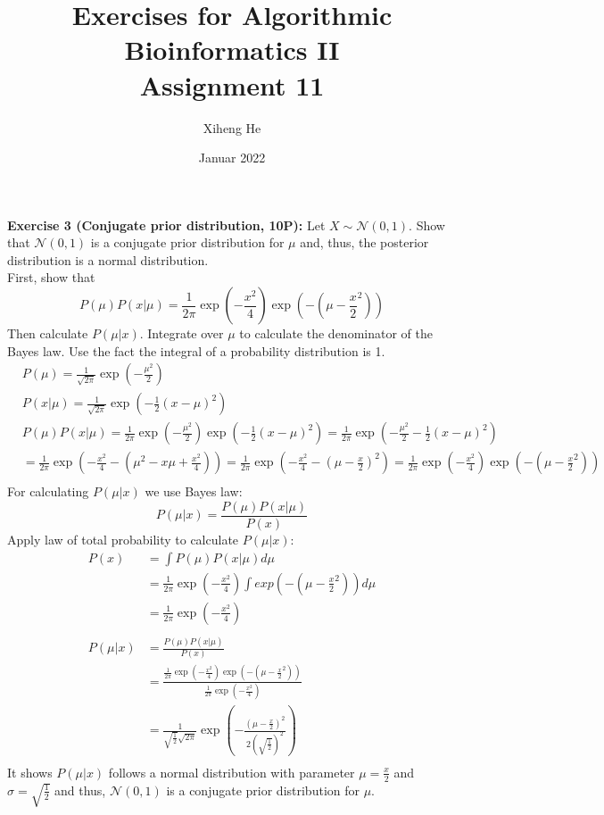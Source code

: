 \documentclass[12pt]{article}
\title{Exercises for Algorithmic Bioinformatics II\\
Assignment 11}
\author{Xiheng He}
\date{Januar 2022}
\begin{document}
{\let\newpage\relax\maketitle}
\begin{flushleft}
\textbf{Exercise 3 (Conjugate prior distribution, 10P):}
\newline
Let $X \sim \mathcal{N}(0,1)$. Show that $\mathcal{N}(0,1)$ is a conjugate prior distribution for $\mu$ and,
thus, the posterior distribution is a normal distribution.
\newline\\
First, show that $$ P(\mu) P(x | \mu) = \frac{1}{2 \pi} \exp(-\frac{x^2}{4}) \exp(-(\mu - \frac{x}{2}^2)) $$
Then calculate $P(\mu | x)$. Integrate over $\mu$ to calculate the denominator of the Bayes law.
Use the fact the integral of a probability distribution is 1.
\newline
\begin{align*}
    &P(\mu) = \frac{1}{\sqrt{2 \pi}} \exp(-\frac{\mu^2}{2}) \\
    &P(x | \mu) = \frac{1}{\sqrt{2 \pi}} \exp(-\frac{1}{2} (x - \mu)^2) \\
    &P(\mu) P(x | \mu) = \frac{1}{2 \pi} \exp(-\frac{\mu^2}{2}) \exp(-\frac{1}{2} (x - \mu)^2)
    = \frac{1}{2 \pi} \exp(-\frac{\mu^2}{2}-\frac{1}{2}(x - \mu)^2) \\
    &= \frac{1}{2 \pi} \exp(-\frac{x^2}{4} - (\mu^2 - x\mu + \frac{x^2}{4})) = \frac{1}{2 \pi} \exp(-\frac{x^2}{4} - (\mu - \frac{x}{2})^2)
    = \frac{1}{2 \pi} \exp(-\frac{x^2}{4}) \exp(-(\mu - \frac{x}{2}^2)) \\ 
\end{align*}
For calculating $P(\mu | x)$ we use Bayes law:
$$ P(\mu | x) = \frac{P(\mu) P(x | \mu)}{P(x)} $$
Apply law of total probability to calculate $P(\mu | x)$:
\begin{align*}
    P(x) &= \int P(\mu)P(x | \mu) d\mu \\ 
    &= \frac{1}{2\pi} \exp(-\frac{x^2}{4}) \int exp(-(\mu - \frac{x}{2}^2)) d\mu \\
    &= \frac{1}{2\pi} \exp(-\frac{x^2}{4})\\ \\
    P(\mu | x) &= \frac{P(\mu) P(x | \mu)}{P(x)} \\
    & = \frac{\displaystyle \frac{1}{2 \pi} \exp(-\frac{x^2}{4}) \exp(-(\mu - \frac{x}{2}^2))}{\displaystyle \frac{1}{2\pi} \exp(-\frac{x^2}{4})}  \\
    & = \frac{1}{\sqrt{\frac{1}{2}} \sqrt{2 \pi}} \exp(-\frac{(\mu - \frac{x}{2})^2}{2 (\sqrt{\frac{1}{2}})^2}) \\
\end{align*}
It shows $P(\mu | x)$ follows a normal distribution with parameter $\mu = \frac{x}{2}$ and $\sigma = \sqrt{\frac{1}{2}}$ and thus, 
$\mathcal{N}(0, 1)$ is a conjugate prior distribution for $\mu$.
\end{flushleft}
\end{document}
